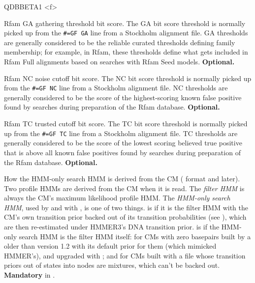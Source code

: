 \begin{sreitems}{QDBBETA1 <f>}
\item [\emprog{GA <f>}] Rfam GA gathering threshold bit score.  The GA
bit score threshold is normally picked up from the \verb+#=GF GA+ line
from a Stockholm alignment file.  GA thresholds are generally
considered to be the reliable curated thresholds defining family
membership; for example, in Rfam, these thresholds define what gets
included in Rfam Full alignments based on searches with Rfam Seed
models. \textbf{Optional.}

\item [\emprog{NC <f>}] Rfam NC noise cutoff bit score.
The NC bit score threshold is normally picked up from the
\verb+#=GF NC+ line from a Stockholm alignment file.  
NC thresholds are generally considered to be the
score of the highest-scoring known false positive found by searches
during preparation of the Rfam database. \textbf{Optional.}

\item [\emprog{TC <f>}] Rfam TC trusted cutoff bit score.
The TC bit score threshold is normally picked up from the
\verb+#=GF TC+ line from a Stockholm alignment file.  
TC thresholds are generally considered to be the score of the lowest
scoring believed true positive that is above all known false positives
found by searches during preparation of the Rfam database.
\textbf{Optional.}

\item [\emprog{HP7 <s>}] How the HMM-only search HMM is derived from
  the CM ( format and later). Two profile HMMs are
  derived from the CM when it is read. The \emph{filter HMM} is always
  the CM's maximum likelihood profile HMM. The \emph{HMM-only search
  HMM}, used by  and  with
  , is one of two things.  is 
  if it is the filter HMM with the CM's own transition prior backed
  out of its transition probabilities (see ), which are
  then re-estimated under HMMER3's DNA transition prior.  is
   if the HMM-only search HMM is the filter HMM itself: for
  CMs with zero basepairs built by a  older than version
  1.2 with its default prior for them (which mimicked HMMER's), and
  upgraded with ; and for CMs built with a
   file whose
  transition priors out of  states into  nodes
  are mixtures, which can't be backed out. \textbf{Mandatory} in
  .


\end{sreitems}

